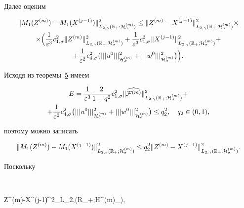 Далее оценим

\begin{multline*}

\|M_1(Z^{(m)})-M_1(X^{(j-1)})\|^2_{L_{2,\gamma}(\mathbb R_{+};{\cal H}^{(m)}_{\sigma})}\le 

\|Z^{(m)}-X^{(j-1)}\|^2_{L_{2,\gamma}(\mathbb R_{+};{\cal H}^{(m)}_{\sigma})}\times

\\

\times 

\Bigl(\frac{1}{\varepsilon^3}c^2_{1,\sigma}

\|Z^{(m)}  \|^2_{L_{2,\gamma}(\mathbb R_{+};{\cal H}^{(m)}_{\sigma})}+

\frac{1}{\varepsilon^3}c^2_{1,\sigma}

\| X^{(j-1)}\|^2_{L_{2,\gamma}(\mathbb R_{+};{\cal H}^{(m)}_{\sigma})}+

\\

+\frac{1}{\varepsilon^2}c^2_{4,\sigma}\bigl(|||u^0|||^2_{{\cal H}^{(m)}_\sigma}+|||w^0|||^2_{{\cal H}^{(m)}_\sigma}\bigr)\Bigr).

\end{multline*}

Исходя из теоремы~\hyperlink{dukh:th:5}{5} имеем

\begin{multline}

E=\frac{1}{\varepsilon^3}\frac{2}{1-q^2}c^2_{1,\sigma}\|\widehat{{\cal F}^{(m)}} \|^2_{L_{2,\gamma}(\mathbb R_{+};{\cal H}^{(m)}_{\sigma})}+

\\

+\frac{1}{\varepsilon^2}c^2_{4,\sigma}\bigl(|||u^0|||^2_{{\cal H}^{(m)}_\sigma}+|||w^0|||^2_{{\cal H}^{(m)}_\sigma}\bigr)\le q_2^2,\quad  q_2\in(0, 1),

\label{duh:ifest}

\end{multline}

поэтому можно записать

$$

\|M_1(Z^{(m)})-M_1(X^{(j-1)})\|^2_{L_{2,\gamma}(\mathbb R_{+};{\cal H}^{(m)}_{\sigma})}\le q_2^2

\|Z^{(m)}-X^{(j-1)}\|^2_{L_{2,\gamma}(\mathbb R_{+};{\cal H}^{(m)}_{\sigma})} .

$$

Поскольку 

$$

\|Z^{(m)}-X^{(j-1)}\|^2_{L_{2,\gamma}(\mathbb R_{+};{\cal H}^{(m)}_{\sigma})},

